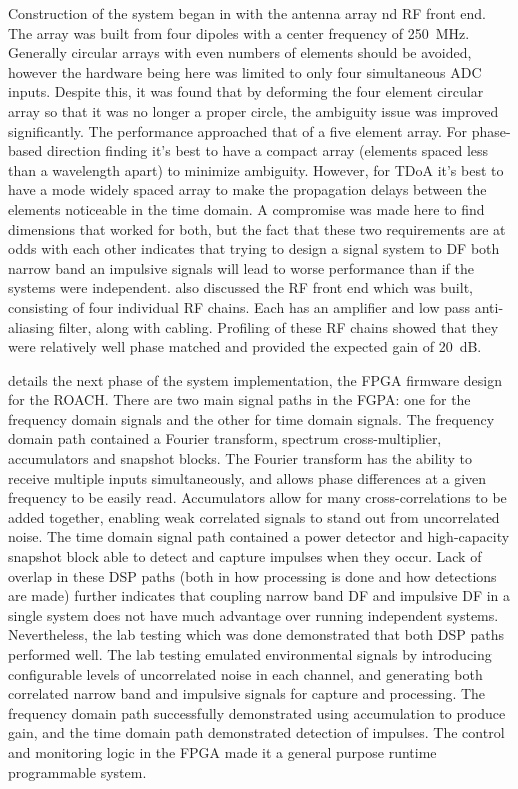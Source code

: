 Construction of the system began in  with the antenna array nd RF front end. The array was built from four dipoles with a center frequency of \SI{250}{\mega\hertz}. Generally circular arrays with even numbers of elements should be avoided, however the hardware being here was limited to only four simultaneous ADC inputs. Despite this, it was found that by deforming the four element circular array so that it was no longer a proper circle, the ambiguity issue was improved significantly. The performance approached that of a five element array. For phase-based direction finding it's best to have a compact array (elements spaced less than a wavelength apart) to minimize ambiguity. However, for TDoA it's best to have a mode widely spaced array to make the propagation delays between the elements noticeable in the time domain. A compromise was made here to find dimensions that worked for both, but the fact that these two requirements are at odds with each other indicates that trying to design a signal system to DF both narrow band an impulsive signals will lead to worse performance than if the systems were independent.  also discussed the RF front end which was built, consisting of four individual RF chains. Each has an amplifier and low pass anti-aliasing filter, along with cabling. Profiling of these RF chains showed that they were relatively well phase matched and provided the expected gain of \SI{20}{\dB}.

 details the next phase of the system implementation, the FPGA firmware design for the ROACH. There are two main signal paths in the FGPA: one for the frequency domain signals and the other for time domain signals. The frequency domain path contained a Fourier transform, spectrum cross-multiplier, accumulators and snapshot blocks. The Fourier transform has the ability to receive multiple inputs simultaneously, and allows phase differences at a given frequency to be easily read. Accumulators allow for many cross-correlations to be added together, enabling weak correlated signals to stand out from uncorrelated noise. The time domain signal path contained a power detector and high-capacity snapshot block able to detect and capture impulses when they occur. Lack of overlap in these DSP paths (both in how processing is done and how detections are made) further indicates that coupling narrow band DF and impulsive DF in a single system does not have much advantage over running independent systems. Nevertheless, the lab testing which was done demonstrated that both DSP paths performed well. The lab testing emulated environmental signals by introducing configurable levels of uncorrelated noise in each channel, and generating both correlated narrow band and impulsive signals for capture and processing. The frequency domain path successfully demonstrated using accumulation to produce gain, and the time domain path demonstrated detection of impulses. The control and monitoring logic in the FPGA made it a general purpose runtime programmable system.


